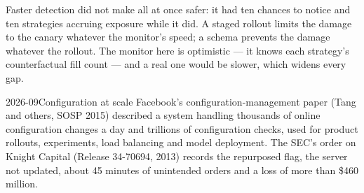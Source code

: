 \begin{omfigure}

\label{fig:pl:signal-serving-and-parameter-management:detection}
\end{omfigure}

\begin{remark}\label{rem:pl:signal-serving-and-parameter-management:detect}
Faster detection did not make all at once safer: it had ten chances to notice and ten strategies accruing exposure while it did. A staged
rollout limits the damage to the canary whatever the monitor's speed; a schema prevents the damage whatever the rollout. The monitor here is
optimistic --- it knows each strategy's counterfactual fill count --- and a real one would be slower, which widens every gap.
\end{remark}

\begin{dated}{2026-09}{Configuration at scale}\label{dat:pl:signal-serving-and-parameter-management:scale}
Facebook's configuration-management paper (Tang and others, SOSP 2015) described a system handling thousands of online configuration changes
a day and trillions of configuration checks, used for product rollouts, experiments, load balancing and model deployment. The SEC's order on
Knight Capital (Release 34-70694, 2013) records the repurposed flag, the server not updated, about 45 minutes of unintended orders and a loss
of more than \$460 million.
\end{dated}

